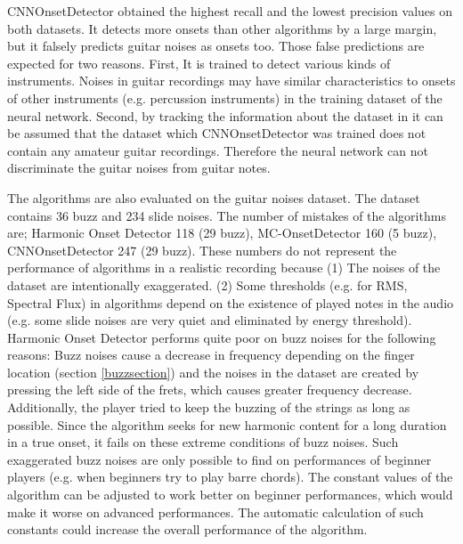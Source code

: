CNNOnsetDetector obtained the highest recall and the lowest precision values on both datasets. It detects more onsets than other algorithms by a large margin, but it falsely predicts guitar noises as onsets too. Those false predictions are expected for two reasons. First, It is trained to detect various kinds of instruments. Noises in guitar recordings may have similar characteristics to onsets of other instruments (e.g. percussion instruments) in the training dataset of the neural network. Second, by tracking the information about the dataset in \cite{schluter2014improved} it can be assumed that the dataset which CNNOnsetDetector was trained does not contain any amateur guitar recordings. Therefore the neural network can not discriminate the guitar noises from guitar notes.

The algorithms are also evaluated on the guitar noises dataset. The dataset contains 36 buzz and 234 slide noises. The number of mistakes of the algorithms are; Harmonic Onset Detector 118 (29 buzz), MC-OnsetDetector 160 (5 buzz), CNNOnsetDetector 247 (29 buzz). These numbers do not represent the performance of algorithms in a realistic recording because (1) The noises of the dataset are intentionally exaggerated. (2) Some thresholds (e.g. for RMS, Spectral Flux) in algorithms depend on the existence of played notes in the audio (e.g. some slide noises are very quiet and eliminated by energy threshold). Harmonic Onset Detector performs quite poor on buzz noises for the following reasons: Buzz noises cause a decrease in frequency depending on the finger location (section \ref{buzzsection}) and the noises in the dataset are created by pressing the left side of the frets, which causes greater frequency decrease. Additionally, the player tried to keep the buzzing of the strings as long as possible. Since the algorithm seeks for new harmonic content for a long duration in a true onset, it fails on these extreme conditions of buzz noises. Such exaggerated buzz noises are only possible to find on performances of beginner players (e.g. when beginners try to play barre chords). The constant values of the algorithm can be adjusted to work better on beginner performances, which would make it worse on advanced performances. The automatic calculation of such constants could increase the overall performance of the algorithm.

